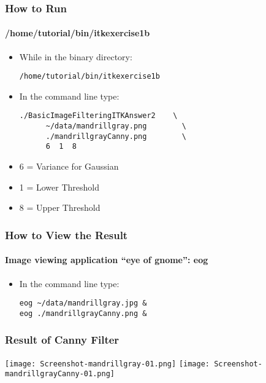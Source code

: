 \begin{frame}[fragile]
\frametitle{How to Run}
\framesubtitle{/home/tutorial/bin/itkexercise1b}
\begin{itemize}
\item While in the binary directory:
\begin{verbatim}
/home/tutorial/bin/itkexercise1b
\end{verbatim}
\pause
\item In the command line type:
\begin{verbatim}
./BasicImageFilteringITKAnswer2    \
      ~/data/mandrillgray.png        \
      ./mandrillgrayCanny.png        \
      6  1  8
\end{verbatim}
\pause
\item 6 = Variance for Gaussian
\item 1 = Lower Threshold
\item 8 = Upper Threshold
\end{itemize}
\end{frame}

\begin{frame}[fragile]
\frametitle{How to View the Result}
\framesubtitle{Image viewing application ``eye of gnome'': eog}
\begin{itemize}
\item In the command line type:
\begin{verbatim}
eog ~/data/mandrillgray.jpg &
eog ./mandrillgrayCanny.png &
\end{verbatim}
\end{itemize}
\end{frame}

\begin{frame}[fragile]
\frametitle{Result of Canny Filter}
\begin{center}
  \texttt{[image: Screenshot-mandrillgray-01.png]}
  \texttt{[image: Screenshot-mandrillgrayCanny-01.png]}
\end{center}
\end{frame}

